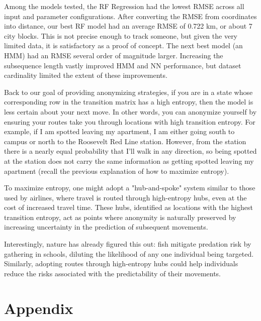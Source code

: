 \documentclass[11pt]{amsart}
\begin{document}
Among the models tested, the RF Regression had the lowest RMSE across all input and parameter configurations.
After converting the RMSE from coordinates into distance, our best RF model had an average RMSE of 0.722 km, or about 7 city blocks.
This is not precise enough to track someone, but given the very limited data, it is satisfactory as a proof of concept.
The next best model (an HMM) had an RMSE several order of magnitude larger.
Increasing the subsequence length vastly improved HMM and NN performance, but dataset cardinality limited the extent of these improvements.

Back to our goal of providing anonymizing strategies, if you are in a state whose corresponding row in the transition matrix has a high entropy, then the model is less certain about your next move.
In other words, you can anonymize yourself by ensuring your routes take you through locations with high transition entropy.
For example, if I am spotted leaving my apartment, I am either going south to campus or north to the Roosevelt Red Line station.
However, from the station there is a nearly equal probability that I'll walk in any direction, so being spotted at the station does not carry the same information as getting spotted leaving my apartment (recall the previous explanation of how to maximize entropy).

To maximize entropy, one might adopt a "hub-and-spoke" system similar to those used by airlines, where travel is routed through high-entropy hubs, even at the cost of increased travel time.
These hubs, identified as locations with the highest transition entropy, act as points where anonymity is naturally preserved by increasing uncertainty in the prediction of subsequent movements.

Interestingly, nature has already figured this out: fish mitigate predation risk by gathering in schools, diluting the likelihood of any one individual being targeted.
Similarly, adopting routes through high-entropy hubs could help individuals reduce the risks associated with the predictability of their movements.
\section*{Appendix}
\end{document}
